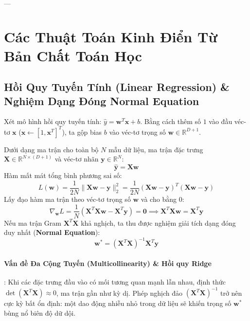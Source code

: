 ---

\section{Các Thuật Toán Kinh Điển Từ Bản Chất Toán Học}
\label{sec:classical-algorithms}

\subsection{Hồi Quy Tuyến Tính (Linear Regression) \& Nghiệm Dạng Đóng Normal Equation}
Xét mô hình hồi quy tuyến tính: $\hat{y} = \mathbf{w}^T \mathbf{x} + b$. Bằng cách thêm số $1$ vào đầu véc-tơ $\mathbf{x}$ ($\mathbf{x} \gets [1, \mathbf{x}^T]^T$), ta gộp bias $b$ vào véc-tơ trọng số $\mathbf{w} \in \mathbb{R}^{D+1}$.

Dưới dạng ma trận cho toàn bộ $N$ mẫu dữ liệu, ma trận đặc trưng $\mathbf{X} \in \mathbb{R}^{N \times (D+1)}$ và véc-tơ nhãn $\mathbf{y} \in \mathbb{R}^N$:
\begin{equation}
\hat{\mathbf{y}} = \mathbf{X} \mathbf{w}
\end{equation}
Hàm mất mát tổng bình phương sai số:
\begin{equation}
L(\mathbf{w}) = \frac{1}{2N} \|\mathbf{X} \mathbf{w} - \mathbf{y}\|_2^2 = \frac{1}{2N} (\mathbf{X} \mathbf{w} - \mathbf{y})^T (\mathbf{X} \mathbf{w} - \mathbf{y})
\end{equation}
Lấy đạo hàm ma trận theo véc-tơ trọng số $\mathbf{w}$ và cho bằng $0$:
\begin{equation}
\nabla_\mathbf{w} L = \frac{1}{N} \left( \mathbf{X}^T \mathbf{X} \mathbf{w} - \mathbf{X}^T \mathbf{y} \right) = \mathbf{0} \implies \mathbf{X}^T \mathbf{X} \mathbf{w} = \mathbf{X}^T \mathbf{y}
\end{equation}
Nếu ma trận Gram $\mathbf{X}^T \mathbf{X}$ khả nghịch, ta thu được nghiệm giải tích dạng đóng duy nhất (\textbf{Normal Equation}):
\begin{equation}
\mathbf{w}^* = (\mathbf{X}^T \mathbf{X})^{-1} \mathbf{X}^T \mathbf{y}
\label{eq:normal-equation}
\end{equation}

\paragraph{Vấn đề Đa Cộng Tuyến (Multicollinearity) \& Hồi quy Ridge}:
Khi các đặc trưng đầu vào có mối tương quan mạnh lẫn nhau, định thức $\det(\mathbf{X}^T \mathbf{X}) \approx 0$, ma trận gần như kỳ dị. Phép nghịch đảo $(\mathbf{X}^T \mathbf{X})^{-1}$ trở nên cực kỳ bất ổn định: một dao động nhiễu nhỏ trong dữ liệu sẽ khiến trọng số $\mathbf{w}^*$ bùng nổ biên độ dữ dội.

